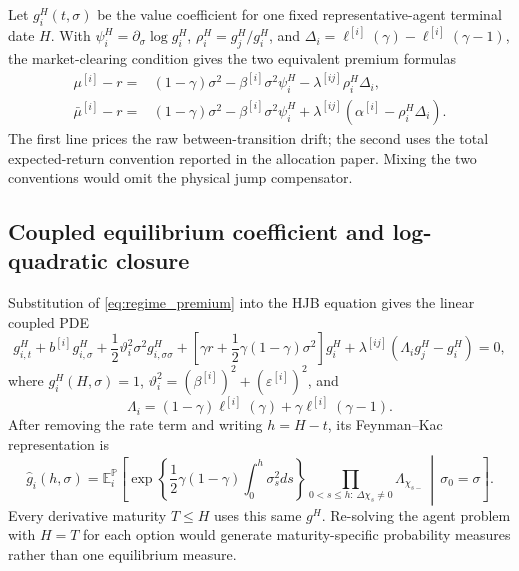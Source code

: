 \documentclass[11pt]{article}
\theoremstyle{remark}
\newcommand{\E}{\mathbb{E}}
\newcommand{\PP}{\mathbb{P}}
\begin{document}
Let $g_i^H(t,\sigma)$ be the value coefficient for one fixed representative-agent
terminal date $H$.  With
$\psi_i^H=\partial_\sigma\log g_i^H$,
$\rho_i^H=g_j^H/g_i^H$, and
$\Delta_i=\ell^{[i]}(\gamma)-\ell^{[i]}(\gamma-1)$, the market-clearing
condition gives the two equivalent premium formulas
\begin{equation}\label{eq:regime_premium}
\begin{split}
\mu^{[i]}-r={}&(1-\gamma)\sigma^2-\beta^{[i]}\sigma^2\psi_i^H
-\lambda^{[ij]}\rho_i^H\Delta_i,\\
\bar\mu^{[i]}-r={}&(1-\gamma)\sigma^2-\beta^{[i]}\sigma^2\psi_i^H
+\lambda^{[ij]}\left(\alpha^{[i]}-\rho_i^H\Delta_i\right).
\end{split}
\end{equation}
The first line prices the raw between-transition drift; the second uses the total
expected-return convention reported in the allocation paper.  Mixing the two
conventions would omit the physical jump compensator.

\subsection{Coupled equilibrium coefficient and log-quadratic closure}

Substitution of \eqref{eq:regime_premium} into the HJB equation gives the linear
coupled PDE
\begin{equation}\label{eq:regime_system}
g_{i,t}^H+b^{[i]}g_{i,\sigma}^H
+\frac12\vartheta_i^2\sigma^2g_{i,\sigma\sigma}^H
+\left[\gamma r+\frac12\gamma(1-\gamma)\sigma^2\right]g_i^H
+\lambda^{[ij]}\left(\Lambda_i g_j^H-g_i^H\right)=0,
\end{equation}
where $g_i^H(H,\sigma)=1$,
$\vartheta_i^2=(\beta^{[i]})^2+(\varepsilon^{[i]})^2$, and
\begin{equation}\label{eq:regime_Lambda}
\Lambda_i=(1-\gamma)\ell^{[i]}(\gamma)
+\gamma\ell^{[i]}(\gamma-1).
\end{equation}
After removing the rate term and writing $h=H-t$, its Feynman--Kac representation is
\begin{equation}\label{eq:regime_FK}
\widehat g_i(h,\sigma)=\E_i^{\PP}\left[
\exp\left\{\frac12\gamma(1-\gamma)\int_0^h\sigma_s^2ds\right\}
\prod_{0<s\le h:\,\Delta\chi_s\ne0}\Lambda_{\chi_{s-}}
\,\middle|\,\sigma_0=\sigma\right].
\end{equation}
Every derivative maturity $T\le H$ uses this same $g^H$.  Re-solving the agent
problem with $H=T$ for each option would generate maturity-specific probability
measures rather than one equilibrium measure.
\end{document}
